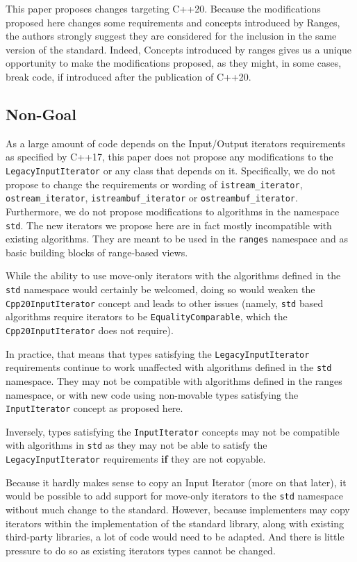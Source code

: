 \documentclass{wg21}
\begin{document}
This paper proposes changes targeting C++20. Because the modifications
proposed here changes some requirements and concepts introduced by
Ranges, the authors strongly suggest they are considered for the
inclusion in the same version of the standard. Indeed, Concepts
introduced by ranges gives us a unique opportunity to make the
modifications proposed, as they might, in some cases, break code, if
introduced after the publication of C++20.

\hypertarget{non-goal}{%
	\subsection{Non-Goal}\label{non-goal}}

As a large amount of code depends on the Input/Output iterators
requirements as specified by C++17, this paper does not propose any
modifications to the \texttt{LegacyInputIterator} or any class that
depends on it. Specifically, we do not propose to change the
requirements or wording of \texttt{istream\_iterator},
\texttt{ostream\_iterator}, \texttt{istreambuf\_iterator} or
\texttt{ostreambuf\_iterator}. Furthermore, we do not propose
modifications to algorithms in the namespace \texttt{std}. The new
iterators we propose here are in fact mostly incompatible with existing
algorithms. They are meant to be used in the \texttt{ranges} namespace
and as basic building blocks of range-based views.

While the ability to use move-only iterators with the algorithms defined
in the \texttt{std} namespace would certainly be welcomed, doing so
would weaken the \texttt{Cpp20InputIterator} concept and leads to other
issues (namely, \texttt{std} based algorithms require iterators to be
\texttt{EqualityComparable}, which the \texttt{Cpp20InputIterator} does
not require).

In practice, that means that types satisfying the
\texttt{LegacyInputIterator} requirements continue to work unaffected
with algorithms defined in the \texttt{std} namespace. They may not be
compatible with algorithms defined in the ranges namespace, or with new
code using non-movable types satisfying the \texttt{InputIterator}
concept as proposed here.

Inversely, types satisfying the \texttt{InputIterator} concepts may not
be compatible with algorithms in \texttt{std} as they may not be able to
satisfy the \texttt{LegacyInputIterator} requirements \textbf{if} they
are not copyable.

Because it hardly makes sense to copy an Input Iterator (more on that
later), it would be possible to add support for move-only iterators to
the \texttt{std} namespace without much change to the standard. However,
because implementers may copy iterators within the implementation of the
standard library, along with existing third-party libraries, a lot of
code would need to be adapted. And there is little pressure to do so as
existing iterators types cannot be changed.
\end{document}
